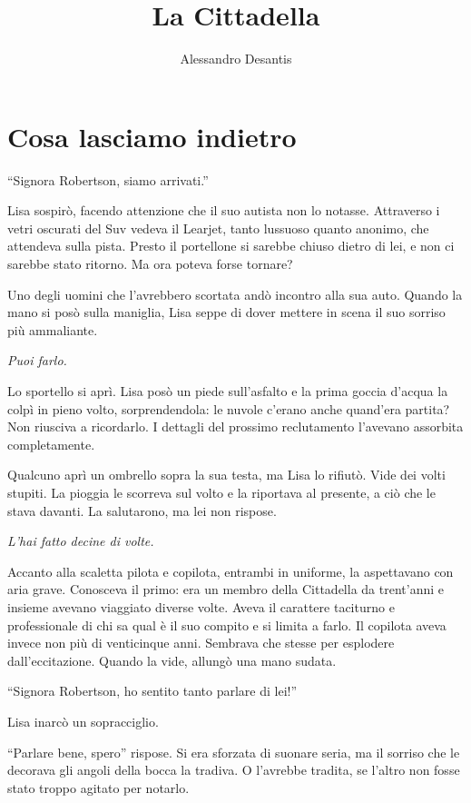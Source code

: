 \documentclass[a4paper,oneside,11pt]{memoir}
\title{La Cittadella}
\author{Alessandro Desantis}
\date{}
\begin{document}
\begin{titlingpage}
\maketitle
\end{titlingpage}

\chapter{Cosa lasciamo indietro}

``Signora Robertson, siamo arrivati.''

Lisa sospirò, facendo attenzione che il suo autista non lo notasse. Attraverso i
vetri oscurati del Suv vedeva il Learjet, tanto lussuoso quanto anonimo, che
attendeva sulla pista. Presto il portellone si sarebbe chiuso dietro di lei, e
non ci sarebbe stato ritorno. Ma ora poteva forse tornare?

Uno degli uomini che l'avrebbero scortata andò incontro alla sua auto. Quando la
mano si posò sulla maniglia, Lisa seppe di dover mettere in scena il suo sorriso
più ammaliante.

\emph{Puoi farlo.}

Lo sportello si aprì. Lisa posò un piede sull'asfalto e la prima goccia d'acqua
la colpì in pieno volto, sorprendendola: le nuvole c'erano anche quand'era
partita? Non riusciva a ricordarlo. I dettagli del prossimo reclutamento
l'avevano assorbita completamente.

Qualcuno aprì un ombrello sopra la sua testa, ma Lisa lo rifiutò. Vide dei volti
stupiti. La pioggia le scorreva sul volto e la riportava al presente, a ciò che
le stava davanti. La salutarono, ma lei non rispose.

\emph{L'hai fatto decine di volte.}

Accanto alla scaletta pilota e copilota, entrambi in uniforme, la aspettavano
con aria grave. Conosceva il primo: era un membro della Cittadella da
trent'anni e insieme avevano viaggiato diverse volte. Aveva il carattere
taciturno e professionale di chi sa qual è il suo compito e si limita a farlo.
Il copilota aveva invece non più di venticinque anni. Sembrava che stesse per
esplodere dall'eccitazione. Quando la vide, allungò una mano sudata.

``Signora Robertson, ho sentito tanto parlare di lei!''

Lisa inarcò un sopracciglio.

``Parlare bene, spero'' rispose. Si era sforzata di suonare seria, ma il sorriso
che le decorava gli angoli della bocca la tradiva. O l'avrebbe tradita, se
l'altro non fosse stato troppo agitato per notarlo.
\end{document}
